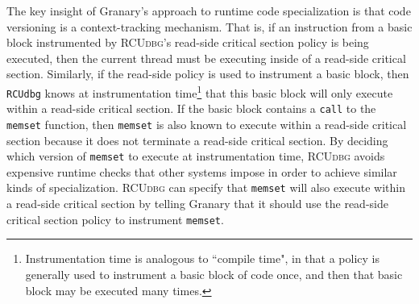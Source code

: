 \documentclass[preprint]{sigplanconf}
\newcommand{\toolname}[1]{{\scshape #1}}
\begin{document}
The key insight of Granary's approach to runtime code specialization is that code versioning is a context-tracking mechanism. That is, if an instruction from a basic block instrumented by \toolname{RCUdbg}'s read-side critical section policy is being executed, then the current thread must be executing inside of a read-side critical section. Similarly, if the read-side policy is used to instrument a basic block, then \texttt{RCUdbg} knows at instrumentation time\footnote{Instrumentation time is analogous to ``compile time", in that a policy is generally used to instrument a basic block of code once, and then that basic block may be executed many times.} that this basic block will only execute within a read-side critical section. If the basic block contains a \texttt{call} to the \texttt{memset} function, then \texttt{memset} is also known to execute within a read-side critical section because it does not terminate a read-side critical section. By deciding which version of \texttt{memset} to execute at instrumentation time, \toolname{RCUdbg} avoids expensive runtime checks that other systems impose in order to achieve similar kinds of specialization. \toolname{RCUdbg} can specify that \texttt{memset} will also execute within a read-side critical section by telling Granary that it should use the read-side critical section policy to instrument \texttt{memset}. 

\end{document}

